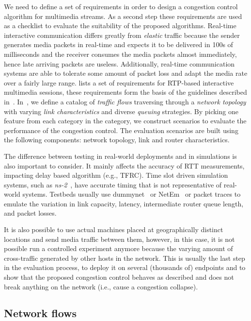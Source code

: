 We need to define a set of requirements in order to design a congestion
control algorithm for multimedia streams. As a second step these requirements are used
as a checklist to evaluate the suitability of the proposed algorithms. Real-time 
interactive communication differs greatly from \emph{elastic} traffic
because the sender generates media packets in real-time and expects it to be
delivered in 100s of milliseconds and the receiver consumes the media packets
almost immediately, hence late arriving packets are useless. Additionally,
real-time communication systems are able to tolerate some amount of packet
loss and adapt the media rate over a fairly large range.
\cite{draft.rmcat.req} lists a set of requirements for RTP-based interactive
multimedia sessions, these requirements form the basis of the guidelines
described in~\cite{draft.rmcat.evaluate}. In~\cite{draft.rmcat.eval.test}, we
define a catalog of \emph{traffic flows} traversing through a \emph{network
topology} with varying \emph{link characteristics} and diverse \emph{queuing}
strategies. By picking one feature from each category in the category, we
construct scenarios to evaluate the performance of the congestion control. The
evaluation scenarios are built using the following components: network
topology, link and router characteristics.

The difference between testing in real-world deployments and in simulations is
also important to consider. It mainly affects the accuracy of RTT
measurements, impacting delay based algorithm (e.g., TFRC). Time slot driven
simulation systems, such as \emph{ns-2}~\cite{ns2}, have accurate timing that
is not representative of real-world systems. Testbeds usually use
dummynet~\cite{Carbone:2010p3502} or NetEm~\cite{netem} or packet traces to
emulate the variation in link capacity, latency, intermediate router queue
length, and packet losses. 

It is also possible to use actual machines placed at geographically distinct
locations and send media traffic between them, however, in this case, it is
not possible run a controlled experiment anymore because the varying amount of
cross-traffic generated by other hosts in the network. This is usually the
last step in the evaluation process, to deploy it on several (thousands of)
endpoints and to show that the proposed congestion control behaves as
described and does not break anything on the network (i.e., cause a congestion
collapse).

\subsection{Network flows}

